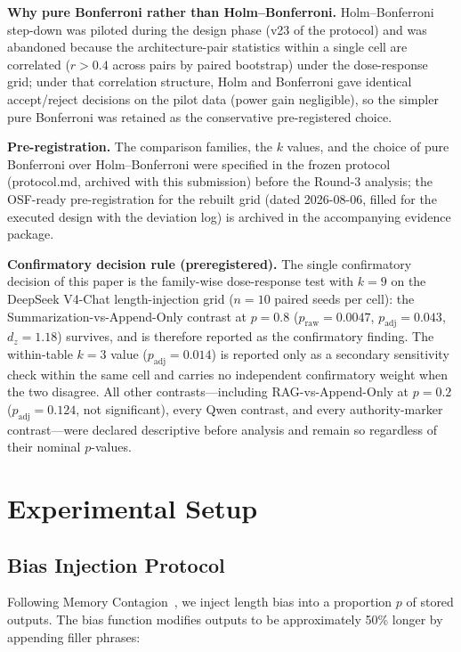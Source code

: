 \documentclass[11pt]{article}
\begin{document}
\textbf{Why pure Bonferroni rather than Holm--Bonferroni.} Holm--Bonferroni step-down was piloted during the design phase (v23 of the protocol) and was abandoned because the architecture-pair statistics within a single cell are correlated ($r > 0.4$ across pairs by paired bootstrap) under the dose-response grid; under that correlation structure, Holm and Bonferroni gave identical accept/reject decisions on the pilot data (power gain negligible), so the simpler pure Bonferroni was retained as the conservative pre-registered choice.

\textbf{Pre-registration.} The comparison families, the $k$ values, and the choice of pure Bonferroni over Holm--Bonferroni were specified in the frozen protocol (protocol.md, archived with this submission) before the Round-3 analysis; the OSF-ready pre-registration for the rebuilt grid (dated 2026-08-06, filled for the executed design with the deviation log) is archived in the accompanying evidence package.

\textbf{Confirmatory decision rule (preregistered).} The single confirmatory decision of this paper is the family-wise dose-response test with $k{=}9$ on the DeepSeek V4-Chat length-injection grid ($n{=}10$ paired seeds per cell): the Summarization-vs-Append-Only contrast at $p{=}0.8$ ($p_{\text{raw}}{=}0.0047$, $p_{\text{adj}}{=}0.043$, $d_z{=}1.18$) survives, and is therefore reported as the confirmatory finding. The within-table $k{=}3$ value ($p_{\text{adj}}{=}0.014$) is reported only as a secondary sensitivity check within the same cell and carries no independent confirmatory weight when the two disagree. All other contrasts---including RAG-vs-Append-Only at $p{=}0.2$ ($p_{\text{adj}}{=}0.124$, not significant), every Qwen contrast, and every authority-marker contrast---were declared descriptive before analysis and remain so regardless of their nominal $p$-values.


\section{Experimental Setup}
\label{sec:experimental-setup}

\subsection{Bias Injection Protocol}

Following Memory Contagion~\cite{memorycontagion2026}, we inject length bias into a proportion $p$ of stored outputs. The bias function modifies outputs to be approximately 50\% longer by appending filler phrases:
\end{document}
